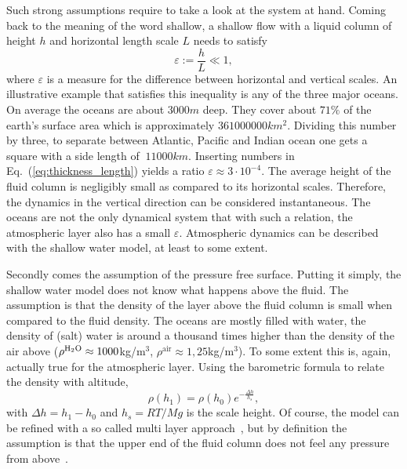 Such strong assumptions require to take a look at the system at hand.
Coming back to the meaning of the word shallow, a shallow flow with a liquid column of height $h$ and horizontal length scale $L$ needs to satisfy
\begin{equation}\label{eq:thickness_length}
    \varepsilon := \frac{h}{L} \ll 1,
\end{equation}
where $\varepsilon$ is a measure for the difference between horizontal and vertical scales.
An illustrative example that satisfies this inequality is any of the three major oceans.
On average the oceans are about $3000m$ deep. 
They cover about $71\%$ of the earth's surface area which is approximately $361000000km^2$.
Dividing this number by three, to separate between Atlantic, Pacific and Indian ocean one gets a square with a side length of $~11000km$.
Inserting numbers in Eq.~(\ref{eq:thickness_length}) yields a ratio $\varepsilon \approx 3\cdot 10^{-4}$.
The average height of the fluid column is negligibly small as compared to its horizontal scales.
Therefore, the dynamics in the vertical direction can be considered instantaneous. 
The oceans are not the only dynamical system that with such a relation, the atmospheric layer also has a small $\varepsilon$. 
Atmospheric dynamics can be described with the shallow water model, at least to some extent.

Secondly comes the assumption of the pressure free surface.
Putting it simply, the shallow water model does not know what happens above the fluid.
The assumption is that the density of the layer above the fluid column is small when compared to the fluid density.
The oceans are mostly filled with water, the density of (salt) water is around a thousand times higher than the density of the air above ($\rho^{\ce{H2O}} \approx 1000$kg/m$^3$, $\rho^{\text{air}} \approx 1,25$kg/m$^3$).
To some extent this is, again, actually true for the atmospheric layer.
Using the barometric formula to relate the density with altitude,
\begin{equation}\label{eq:bareometric_form}
    \rho(h_1) = \rho(h_0)e^{-\frac{\Delta h}{h_s}},
\end{equation}
with $\Delta h = h_1 - h_0$ and $h_s = RT/Mg$ is the scale height.
Of course, the model can be refined with a so called multi layer approach~\cite{tubbsMultilayerShallowWater2009, prestininziEffectIntrinsicViscosity2013}, but by definition the assumption is that the upper end of the fluid column does not feel any pressure from above~\cite{tanShallowWaterHydrodynamics1992, jamesNewFrictionModel2019}.


